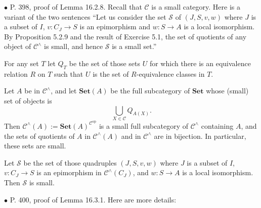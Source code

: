 \documentclass[12pt]{article}
\theoremstyle{remark}%
\newcommand{\bu}{\bullet}
\newcommand{\n}{\noindent}
\newcommand{\cc}{\mathcal}
\newcommand{\C}{\mathcal C}
\newcommand{\Set}{\textbf{Set}}
\DeclareMathOperator{\op}{op}
\begin{document}

\n$\bu$ P. 398, proof of Lemma 16.2.8. Recall that $\C$ is a small category. Here is a variant of the two sentences ``Let us consider the set $\cc S$ of $(J,S,v,w)$ where $J$ is a subset of $I$, $v:C_J\to S$ is an epimorphism and $w:S\to A$ is a local isomorphism. By Proposition 5.2.9 and the result of Exercise 5.1, the set of quotients of any object of $\C^\wedge$ is small, and hence $\cc S$ is a small set.'' 

For any set $T$ let $Q_T$ be the set of those sets $U$ for which there is an equivalence relation $R$ on $T$ such that $U$ is the set of $R$-equivalence classes in $T$. 

Let $A$ be in $\C^\wedge$, and let $\Set(A)$ be the full subcategory of $\Set$ whose (small) set of objects is 
$$
\bigcup_{X\in\C}Q_{A(X)}.
$$ 
Then $\C^\wedge(A):=\Set(A)^{\C^{\op}}$ is a small full subcategory of $\C^\wedge$ containing $A$, and the sets of quotients of $A$ in $\C^\wedge(A)$ and in $\C^\wedge$ are in bijection. In particular, these sets are small. 

Let $\cc S$ be the set of those quadruples $(J,S,v,w)$ where $J$ is a subset of $I$, $v:C_J\to S$ is an epimorphism in $\C^\wedge(C_J)$, and $w:S\to A$ is a local isomorphism. Then $\cc S$ is small. 


\n$\bu$ P. 400, proof of Lemma 16.3.1. Here are more details: 
\end{document}
